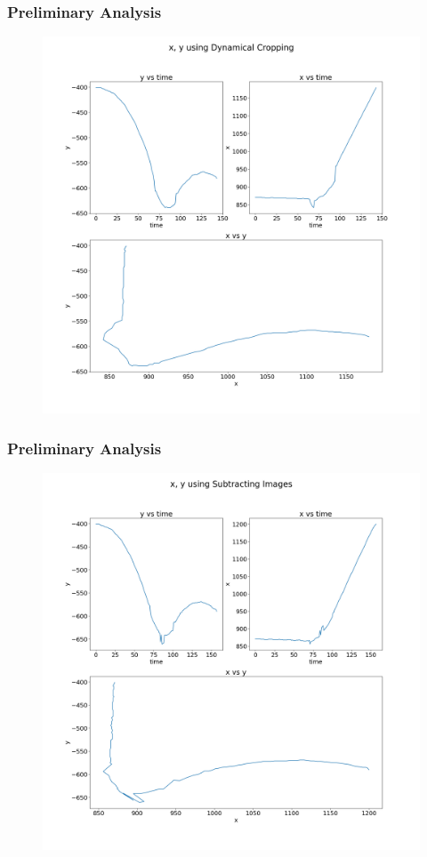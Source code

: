 \documentclass{beamer}
\begin{document}
\begin{frame}
    \frametitle{Preliminary Analysis}
    \begin{figure}
        \centering
        \includegraphics[scale=0.2]{x_y_using_dc.png}
    \end{figure}
\end{frame}
\begin{frame}
    \frametitle{Preliminary Analysis}
    \begin{figure}
        \centering
        \includegraphics[scale=0.2]{x_y_using_si.png}
    \end{figure}
\end{frame}
\end{document}
